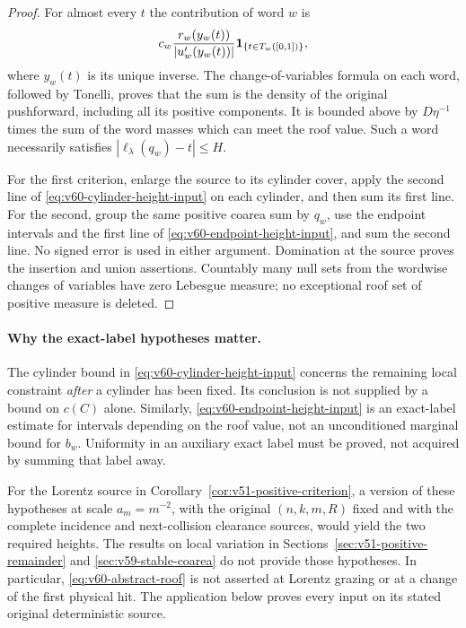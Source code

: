 \begin{proof}
For almost every $t$ the contribution of word $w$ is
\[
 c_w\frac{r_w(y_w(t))}{|u_w'(y_w(t))|}
                    \mathbf1_{\{t\in T_w([0,1])\}},
\]
where $y_w(t)$ is its unique inverse. The change-of-variables formula
on each word, followed by Tonelli, proves that the sum is the density
of the original pushforward, including all its positive components.
It is bounded above by $D\eta^{-1}$ times the sum of the word masses
which can meet the roof value. Such a word necessarily satisfies
$|\ell_\lambda(q_w)-t|\le H$.

For the first criterion, enlarge the source to its cylinder cover,
apply the second line of \eqref{eq:v60-cylinder-height-input} on each
cylinder, and then sum its first line. For the second, group the same
positive coarea sum by $q_w$, use the endpoint intervals and the first
line of \eqref{eq:v60-endpoint-height-input}, and sum the second line.
No signed error is used in either argument. Domination at the source
proves the insertion and union assertions. Countably many null sets
from the wordwise changes of variables have zero Lebesgue measure;
no exceptional roof set of positive measure is deleted.
\end{proof}

\paragraph{Why the exact-label hypotheses matter.}
The cylinder bound in \eqref{eq:v60-cylinder-height-input} concerns the
remaining local constraint \emph{after} a cylinder has been fixed.
Its conclusion is not supplied by a bound on $c(C)$ alone. Similarly,
\eqref{eq:v60-endpoint-height-input} is an exact-label estimate for
intervals depending on the roof value, not an unconditioned marginal
bound for $b_w$. Uniformity in an auxiliary exact label must be proved,
not acquired by summing that label away.

For the Lorentz source in Corollary~\ref{cor:v51-positive-criterion},
a version of these hypotheses at scale $a_m=m^{-2}$, with the original
$(n,k,m,R)$ fixed and with the complete incidence and next-collision
clearance sources, would yield the two required heights. The results
on local variation in Sections~\ref{sec:v51-positive-remainder} and
\ref{sec:v59-stable-coarea} do not provide those hypotheses. In
particular, \eqref{eq:v60-abstract-roof} is not asserted at Lorentz
grazing or at a change of the first physical hit. The application below
proves every input on its stated original deterministic source.
